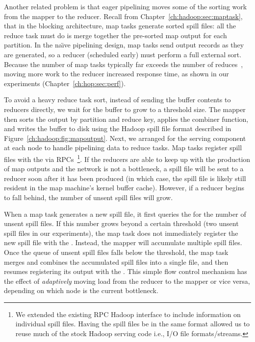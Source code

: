 Another related problem is that eager pipelining moves some of the sorting work
from the mapper to the reducer.  Recall from
Chapter~\ref{ch:hadoop:sec:maptask}, that in the blocking architecture, map
tasks generate sorted spill files: all the reduce task must do is merge
together the pre-sorted map output for each partition.  In the na\"{\i}ve
pipelining design, map tasks send output records as they are generated, so a
reducer (scheduled early) must perform a full external sort.  Because the
number of map tasks typically far exceeds the number of
reduces~\cite{mapreduce-osdi}, moving more work to the reducer increased
response time, as shown in our experiments (Chapter~\ref{ch:hop:sec:perf}).

To avoid a heavy reduce task sort, instead of sending the buffer contents to
reducers directly, we wait for the buffer to grow to a threshold size.  The
mapper then sorts the output by partition and reduce key, applies the combiner
function, and writes the buffer to disk using the Hadoop spill file format
described in Figure~\ref{ch:hadoop:fig:mapoutput}.  Next, we arranged for the
{\TT} serving component at each node to handle pipelining data to reduce tasks.
Map tasks register spill files with the {\TT} via RPCs~\footnote{We extended
the existing RPC Hadoop interface to include information on individual spill
files.  Having the spill files be in the same format allowed us to reuse much
of the stock Hadoop serving code i.e., I/O file formats/streams.}.  If the
reducers are able to keep up with the production of map outputs and the network
is not a bottleneck, a spill file will be sent to a reducer soon after it has
been produced (in which case, the spill file is likely still resident in the
map machine's kernel buffer cache).  However, if a reducer begins to fall
behind, the number of unsent spill files will grow.

When a map task generates a new spill file, it first queries the {\TT} for the
number of unsent spill files.  If this number grows beyond a certain threshold
(two unsent spill files in our experiments), the map task does not immediately
register the new spill file with the {\TT}.  Instead, the mapper will
accumulate multiple spill files.  Once the queue of unsent spill files falls
below the threshold, the map task merges and combines the accumulated spill
files into a single file, and then resumes registering its output with the
{\TT}.  This simple flow control mechanism has the effect of {\em adaptively}
moving load from the reducer to the mapper or vice versa, depending on which
node is the current bottleneck.

